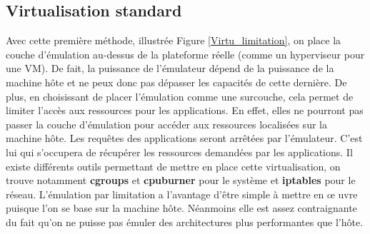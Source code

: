 \subsection{Virtualisation standard}
\label{section:limitation}

Avec cette première méthode, illustrée Figure \ref{Virtu_limitation}, on place
la couche d'émulation au-dessus de la plateforme réelle (comme un hyperviseur
pour une VM). De fait, la puissance de l'émulateur dépend de la puissance de la
machine hôte et ne peux donc pas dépasser les capacités de cette dernière. De
plus, en choisissant de placer l'émulation comme une surcouche, cela permet de
limiter l'accès aux ressources pour les applications. En effet, elles ne
pourront pas passer la couche d'émulation pour accéder aux ressources localisées
sur la machine hôte. Les requêtes des applications seront arrêtées par
l'émulateur. C'est lui qui s'occupera de récupérer les ressources demandées par
les applications. Il existe différents outils permettant de mettre en place
cette virtualisation, on trouve notamment \textbf{cgroups} \citep{cgroups} et
\textbf{cpuburner} \citep{canon2006wrekavoc, buchert2011methods} pour le système
et \textbf{iptables} \citep{netfilter_iptables, iptables_man} pour le
réseau. L'émulation par limitation a l'avantage d'être simple à mettre en \oe
uvre puisque l'on se base sur la machine hôte. Néanmoins elle est assez
contraignante du fait qu'on ne puisse pas émuler des architectures plus
performantes que l'hôte.

